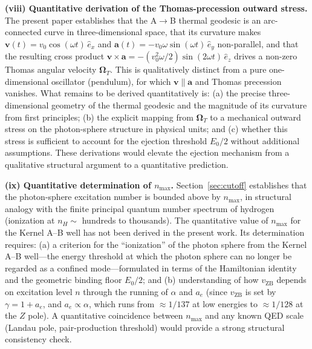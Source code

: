 \documentclass[%
 reprint, amsmath,amssymb, aps, prb, ]{revtex4-2}
\numberwithin{equation}{section}
\begin{document}
\textbf{(viii) Quantitative derivation of the Thomas-precession outward stress.} The present paper establishes that the A$\to$B thermal geodesic is an arc-connected curve in three-dimensional space, that its curvature makes $\mathbf{v}(t) = v_0\cos(\omega t)\,\hat{e}_x$ and $\mathbf{a}(t) = -v_0\omega\sin(\omega t)\,\hat{e}_y$ non-parallel, and that the resulting cross product $\mathbf{v} \times \mathbf{a} = -(v_0^2\omega/2)\sin(2\omega t)\,\hat{e}_z$ drives a non-zero Thomas angular velocity $\boldsymbol{\Omega}_T$. This is qualitatively distinct from a pure one-dimensional oscillator (pendulum), for which $\mathbf{v} \parallel \mathbf{a}$ and Thomas precession vanishes. What remains to be derived quantitatively is: (a) the precise three-dimensional geometry of the thermal geodesic and the magnitude of its curvature from first principles; (b) the explicit mapping from $\boldsymbol{\Omega}_T$ to a mechanical outward stress on the photon-sphere structure in physical units; and (c) whether this stress is sufficient to account for the ejection threshold $E_0/2$ without additional assumptions. These derivations would elevate the ejection mechanism from a qualitative structural argument to a quantitative prediction.

\textbf{(ix) Quantitative determination of $n_{\max}$.} Section~\ref{sec:cutoff} establishes that the photon-sphere excitation number is bounded above by $n_{\max}$, in structural analogy with the finite principal quantum number spectrum of hydrogen (ionization at $n_H \sim$ hundreds to thousands). The quantitative value of $n_{\max}$ for the Kernel A--B well has not been derived in the present work. Its determination requires: (a) a criterion for the ``ionization'' of the photon sphere from the Kernel A--B well---the energy threshold at which the photon sphere can no longer be regarded as a confined mode---formulated in terms of the Hamiltonian identity and the geometric binding floor $E_0/2$; and (b) understanding of how $v_{\text{ZB}}$ depends on excitation level $n$ through the running of $\alpha$ and $a_e$ (since $v_{\text{ZB}}$ is set by $\gamma = 1 + a_e$, and $a_e \propto \alpha$, which runs from $\approx 1/137$ at low energies to $\approx 1/128$ at the $Z$ pole). A quantitative coincidence between $n_{\max}$ and any known QED scale (Landau pole, pair-production threshold) would provide a strong structural consistency check.
\end{document}
